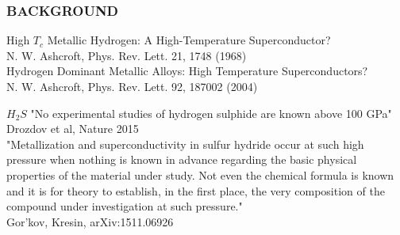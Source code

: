\documentclass[amssymb,amsmath]{beamer}
\begin{document}
\begin{frame}
\frametitle{BACKGROUND}
\begin{block}{High $T_c$}
Metallic Hydrogen: A High-Temperature Superconductor? \\
\quad N. W. Ashcroft, Phys. Rev. Lett. 21, 1748 (1968)\\[0.5cm]
Hydrogen Dominant Metallic Alloys: High Temperature Superconductors? \\
\quad N. W. Ashcroft, Phys. Rev. Lett. 92, 187002 (2004)
\end{block}
\begin{block}{$H_2 S$}
"No experimental studies of hydrogen sulphide are known above 100 GPa" \\
\quad Drozdov et al, Nature 2015 \\ [0.5cm]
"Metallization and superconductivity in sulfur hydride occur at such
high pressure when nothing is known in advance regarding the basic physical properties of the material
under study. Not even the chemical formula is known and it is for theory to establish, in the first place,
the very composition of the compound under investigation at such pressure." \\
\quad Gor’kov, Kresin, arXiv:1511.06926
\end{block}
\end{frame}
\end{document}
